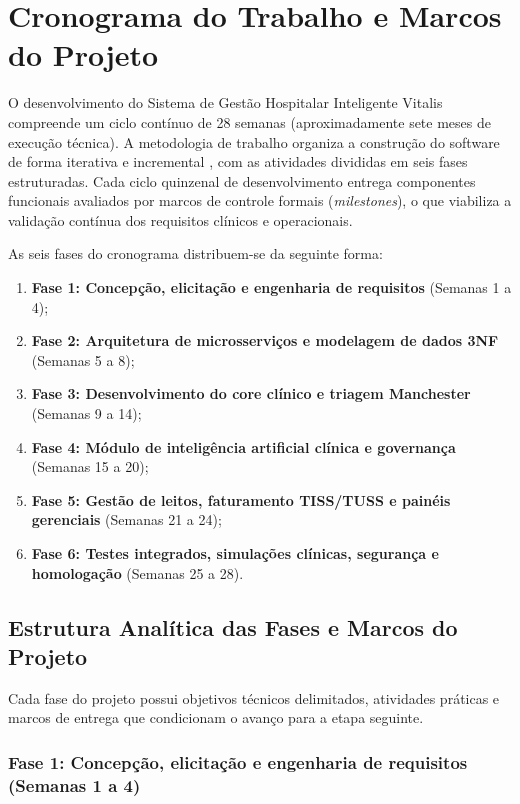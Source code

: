 \section{Cronograma do Trabalho e Marcos do Projeto}

O desenvolvimento do Sistema de Gestão Hospitalar Inteligente Vitalis compreende um ciclo contínuo de 28 semanas (aproximadamente sete meses de execução técnica). A metodologia de trabalho organiza a construção do software de forma iterativa e incremental \cite{pressman:2016, sommerville:2019}, com as atividades divididas em seis fases estruturadas. Cada ciclo quinzenal de desenvolvimento entrega componentes funcionais avaliados por marcos de controle formais (\textit{milestones}), o que viabiliza a validação contínua dos requisitos clínicos e operacionais.

As seis fases do cronograma distribuem-se da seguinte forma:
\begin{enumerate}[leftmargin=*]
    \item \textbf{Fase 1: Concepção, elicitação e engenharia de requisitos} (Semanas 1 a 4);
    \item \textbf{Fase 2: Arquitetura de microsserviços e modelagem de dados 3NF} (Semanas 5 a 8);
    \item \textbf{Fase 3: Desenvolvimento do core clínico e triagem Manchester} (Semanas 9 a 14);
    \item \textbf{Fase 4: Módulo de inteligência artificial clínica e governança} (Semanas 15 a 20);
    \item \textbf{Fase 5: Gestão de leitos, faturamento TISS/TUSS e painéis gerenciais} (Semanas 21 a 24);
    \item \textbf{Fase 6: Testes integrados, simulações clínicas, segurança e homologação} (Semanas 25 a 28).
\end{enumerate}

\subsection{Estrutura Analítica das Fases e Marcos do Projeto}

Cada fase do projeto possui objetivos técnicos delimitados, atividades práticas e marcos de entrega que condicionam o avanço para a etapa seguinte.

\subsubsection{Fase 1: Concepção, elicitação e engenharia de requisitos (Semanas 1 a 4)}

